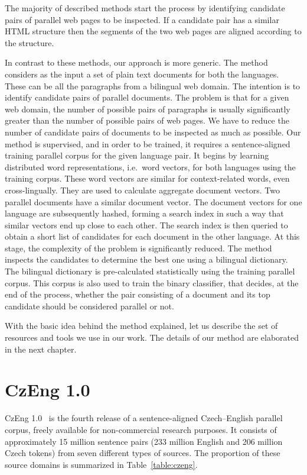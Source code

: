The majority of described methods start the process by identifying candidate pairs of parallel web pages to be inspected. If a candidate pair has a similar HTML structure then the segments of the two web pages are aligned according to the structure. 

In contrast to these methods, our approach is more generic. The method considers as the input a set of plain text documents for both the languages. These can be all the paragraphs from a bilingual web domain. The intention is to identify candidate pairs of parallel documents. The problem is that for a given web domain, the number of possible pairs of paragraphs is usually significantly greater than the number of possible pairs of web pages. We have to reduce the number of candidate pairs of documents to be inspected as much as possible. Our method is supervised, and in order to be trained, it requires a sentence-aligned training parallel corpus for the given language pair. It begins by learning distributed word representations, i.e.\ word vectors, for both languages using the training corpus. These word vectors are similar for context-related words, even cross-lingually. They are used to calculate aggregate document vectors. Two parallel documents have a similar document vector. The document vectors for one language are subsequently hashed, forming a search index in such a way that similar vectors end up close to each other. The search index is then queried to obtain a short list of candidates for each document in the other language. At this stage, the complexity of the problem is significantly reduced. The method inspects the candidates to determine the best one using a bilingual dictionary. The bilingual dictionary is pre-calculated statistically using the training parallel corpus. This corpus is also used to train the binary classifier, that decides, at the end of the process, whether the pair consisting of a document and its top candidate should be considered parallel or not.

With the basic idea behind the method explained, let us describe the set of resources and tools we use in our work. The details of our method are elaborated in the next chapter.

\section{CzEng 1.0}
\label{section:czeng}

CzEng 1.0~\cite{Bojar12_2} is the fourth release of a sentence-aligned Czech--English parallel corpus, freely available for non-commercial research purposes. It consists of approximately 15 million sentence pairs (233 million English and 206 million Czech tokens) from seven different types of sources. The proportion of these source domains is summarized in Table~\ref{table:czeng}.


